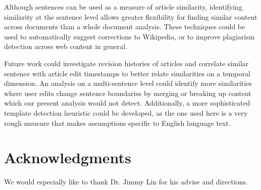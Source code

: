 \documentclass{acm_proc_article-sp}
\begin{document}
Although sentences can be used as a measure of article similarity, identifying similarity at the sentence level allows greater flexibility for finding similar content across documents than a whole document analysis. These techniques could be used to automatically suggest corrections to Wikipedia, or to improve plagiarism detection across web content in general.

Future work could investigate revision histories of articles and correlate similar sentence with article edit timestamps to better relate similarities on a temporal dimension. An analysis on a multi-sentence level could identify more similarities where user edits change sentence boundaries by merging or breaking up content which our present analysis would not detect. Additionally, a more sophisticated template detection heuristic could be developed, as the one used here is a very rough measure that makes assumptions specific to English language text.

\section{Acknowledgments}
We would especially like to thank Dr. Jimmy Lin for his advise and directions.



\balancecolumns
\end{document}
